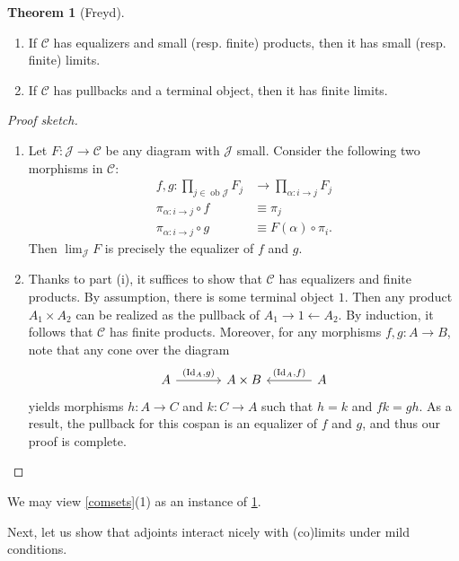 \documentclass[10pt,letterpaper,cm]{nupset}
\theoremstyle{definition}
\theoremstyle{theorem}
\newtheorem{theorem}[definition]{Theorem}
\theoremstyle{remark}
\newcommand{\1}{\mathbf{1}}
\renewcommand{\c}{\mathscr{C}}
\renewcommand{\j}{\mathscr{J}}
\newcommand{\0}{\vec 0}
\DeclareMathOperator{\id}{Id}
\DeclareMathOperator{\ob}{ob}
\begin{document}
\smallskip

\begin{theorem}[Freyd]\label{Freyd} $ $
\begin{enumerate}[label=(\roman*)]
\item If $\c$ has equalizers and small (resp. finite) products, then it has small (resp. finite) limits.
\item If $\c$ has pullbacks and a terminal object, then it has finite limits.
\end{enumerate}
\end{theorem}
\begin{proof}[Proof sketch] $ $
\begin{enumerate}
\item Let $F : \j \to \c$ be any diagram with $\j$ small. Consider the following two morphisms in $\c$:
\begin{align*}
f, g: \prod_{j\in \ob{\j}}F_j &\to \prod_{\alpha : i \to j}F_j
\\ \pi_{\alpha : i \to j} \circ f &\equiv \pi_j
\\ \pi_{\alpha : i \to j} \circ g &\equiv F(\alpha) \circ \pi_i.
\end{align*}
Then $\lim_{\j}{F}$ is precisely the equalizer of $f$ and $g$.
\item Thanks to part (i), it suffices to show that $\c$ has equalizers and finite products. By assumption, there is some terminal object $1$. Then any product $A_1 \times A_2$ can be realized as the pullback of $A_1 \rightarrow 1 \leftarrow A_2$. By induction, it follows that $\c$ has finite products. Moreover, for any morphisms $f,g : A \to B$, note that any cone over the diagram 
\[
\begin{tikzcd}[column sep=large]
A \arrow[r, "{\left(\id_A, g\right)}"] & A\times B & A \arrow[l, "{\left(\id_A, f\right)}"']
\end{tikzcd}
\] yields morphisms $h: A \to C$ and $k : C \to A$ such that $h=k$ and $fk = gh$. As a result, the pullback for this cospan is an equalizer of $f$ and $g$, and thus our proof is complete.
\end{enumerate}
\end{proof}

We may view \cref{comsets}(1) as an instance of \cref{Freyd}.

\medskip

Next, let us show that adjoints interact nicely with (co)limits under mild conditions.
\end{document}
